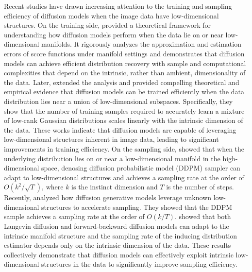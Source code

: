 \documentclass[../../book-main.tex]{subfiles}
\begin{document}

 
Recent studies have drawn increasing attention to the training and sampling efficiency of diffusion models when the image data have low-dimensional structures. On the training side, \cite{chen2023score} provided a theoretical framework for understanding how diffusion models perform when the data lie on or near low-dimensional manifolds. It rigorously analyzes the approximation and estimation errors of score functions under manifold settings and demonstrates that diffusion models can achieve efficient distribution recovery with sample and computational complexities that depend on the intrinsic, rather than ambient, dimensionality of the data. Later, \cite{wang2024diffusion} extended the analysis and provided compelling theoretical and empirical evidence that diffusion models can be trained efficiently when the data distribution lies near a union of low-dimensional subspaces. Specifically, they show that the number of training samples required to accurately learn a mixture of low-rank Gaussian distributions scales linearly with the intrinsic dimension of the data. These works indicate that diffusion models are capable of leveraging low-dimensional structures inherent in image data, leading to significant improvements in training efficiency. On the sampling side, \cite{li2024adapting} showed that when the underlying distribution lies on or near a low-dimensional manifold in the high-dimensional space, denosing diffusion probabilistic model (DDPM) sampler can adapt to low-dimensional structures and achieves a sampling rate at the order of $O(k^2/\sqrt{T})$, where $k$ is the instinct dimension and $T$ is the number of steps. Recently, \cite{liang2025low} analyzed how diffusion generative models leverage unknown low-dimensional structures to accelerate sampling. They showed that the DDPM sample achieves a sampling rate at the order of $O(k/T)$. \cite{tang2024adaptivity} showed that both Langevin diffusion and forward-backward diffusion models can adapt to the intrinsic manifold structure and the sampling rate of the inducing distribution estimator depends only on the intrinsic dimension of the data. These results collectively demonstrate that diffusion models can effectively exploit intrinsic low-dimensional structures in the data to significantly improve sampling efficiency. 
\end{document}
